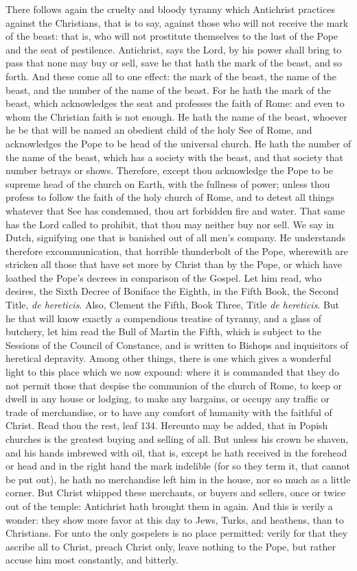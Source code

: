 There follows again the cruelty and bloody tyranny which Antichrist practices against the Christians, that is to say, against those who will not receive the mark of the beast: that is, who will not prostitute themselves to the lust of the Pope and the seat of pestilence. Antichrist, says the Lord, by his power shall bring to pass that none may buy or sell, save he that hath the mark of the beast, and so forth. And these come all to one effect: the mark of the beast, the name of the beast, and the number of the name of the beast. For he hath the mark of the beast, which acknowledges the seat and professes the faith of Rome: and even to whom the Christian faith is not enough. He hath the name of the beast, whoever he be that will be named an obedient child of the holy See of Rome, and acknowledges the Pope to be head of the universal church. He hath the number of the name of the beast, which has a society with the beast, and that society that number betrays or shows. Therefore, except thou acknowledge the Pope to be supreme head of the church on Earth, with the fullness of power; unless thou profess to follow the faith of the holy church of Rome, and to detest all things whatever that See has condemned, thou art forbidden fire and water. That same has the Lord called to prohibit, that thou may neither buy nor sell. We say in Dutch, signifying one that is banished out of all men's company. He understands therefore excommunication, that horrible thunderbolt of the Pope, wherewith are stricken all those that have set more by Christ than by the Pope, or which have loathed the Pope’s decrees in comparison of the Gospel. Let him read, who desires, the Sixth Decree of Boniface the Eighth, in the Fifth Book, the Second Title, \textit{de hereticis}. Also, Clement the Fifth, Book Three, Title \textit{de hereticis}. But he that will know exactly a compendious treatise of tyranny, and a glass of butchery, let him read the Bull of Martin the Fifth, which is subject to the Sessions of the Council of Constance, and is written to Bishops and inquisitors of heretical depravity. Among other things, there is one which gives a wonderful light to this place which we now expound: where it is commanded that they do not permit those that despise the communion of the church of Rome, to keep or dwell in any house or lodging, to make any bargains, or occupy any traffic or trade of merchandise, or to have any comfort of humanity with the faithful of Christ. Read thou the rest, leaf 134. Hereunto may be added, that in Popish churches is the greatest buying and selling of all. But unless his crown be shaven, and his hands imbrewed with oil, that is, except he hath received in the forehead or head and in the right hand the mark indelible (for so they term it, that cannot be put out), he hath no merchandise left him in the house, nor so much as a little corner. But Christ whipped these merchants, or buyers and sellers, once or twice out of the temple: Antichrist hath brought them in again. And this is verily a wonder: they show more favor at this day to Jews, Turks, and heathens, than to Christians. For unto the only gospelers is no place permitted: verily for that they ascribe all to Christ, preach Christ only, leave nothing to the Pope, but rather accuse him most constantly, and bitterly.

